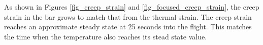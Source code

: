 \documentclass[conf]{new-aiaa}
\begin{document}
As shown in Figures \ref{fig_creep_strain}
and \ref{fig_focused_creep_strain}, the creep strain in the bar 
grows to match that from the thermal strain. 
The creep strain reaches an approximate steady state 
at 25 seconds into the flight. 
This matches the time when the temperature also reaches
its stead state value.


\newpage

\end{document}
